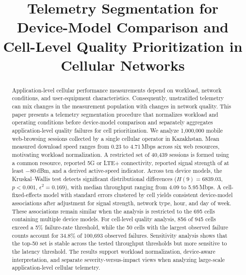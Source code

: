 \documentclass[conference]{IEEEtran}
\begin{document}
\title{Telemetry Segmentation for Device-Model Comparison and Cell-Level Quality Prioritization in Cellular Networks}

\author{
}

\maketitle

\begin{abstract}
Application-level cellular performance measurements depend on workload, network conditions, and user-equipment characteristics. Consequently, unstratified telemetry can mix changes in the measurement population with changes in network quality. This paper presents a telemetry segmentation procedure that normalizes workload and operating conditions before device-model comparison and separately aggregates application-level quality failures for cell prioritization. We analyze 1,000,000 mobile web-browsing sessions collected by a single cellular operator in Kazakhstan. Mean measured download speed ranges from 0.23 to 4.71\,Mbps across six web resources, motivating workload normalization. A restricted set of 40,439 sessions is formed using a common resource, reported 5G or LTE+ connectivity, reported signal strength of at least $-80$\,dBm, and a derived active-speed indicator. Across ten device models, the Kruskal--Wallis test detects significant distributional differences ($H(9)=6839.03$, $p<0.001$, $\epsilon^2=0.169$), with median throughput ranging from 4.09 to 5.95\,Mbps. A cell-fixed-effects model with standard errors clustered by cell yields consistent device-model associations after adjustment for signal strength, network type, hour, and day of week. These associations remain similar when the analysis is restricted to the 695 cells containing multiple device models. For cell-level quality analysis, 856 of 945 cells exceed a 5\% failure-rate threshold, while the 50 cells with the largest observed failure counts account for 34.8\% of 100,693 observed failures. Sensitivity analysis shows that the top-50 set is stable across the tested throughput thresholds but more sensitive to the latency threshold. The results support workload normalization, device-aware interpretation, and separate severity-versus-impact views when analyzing large-scale application-level cellular telemetry.
\end{abstract}
\end{document}

